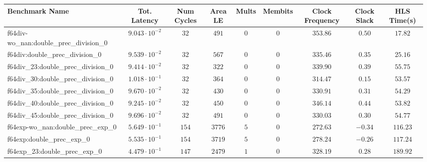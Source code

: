 \begin{tabular}{|l|c|c|c|c|c|c|c|c|}
\hline
Benchmark Name                                 & Tot. Latency            & Num Cycles & Area LE    & Mults   & Membits & Clock Frequency & Clock Slack & HLS Time(s) \\
\hline
f64div-wo\_nan:double\_prec\_division\_0       & $ 9.043 \cdot 10^{-2} $ & $ 32     $ & $ 491    $ & $ 0   $ & $ 0   $ & $ 353.86      $ & $ 0.50    $ & $ 17.82   $ \\
f64div:double\_prec\_division\_0               & $ 9.539 \cdot 10^{-2} $ & $ 32     $ & $ 567    $ & $ 0   $ & $ 0   $ & $ 335.46      $ & $ 0.35    $ & $ 25.16   $ \\
f64div\_23:double\_prec\_division\_0           & $ 9.414 \cdot 10^{-2} $ & $ 32     $ & $ 322    $ & $ 0   $ & $ 0   $ & $ 339.90      $ & $ 0.39    $ & $ 55.75   $ \\
f64div\_30:double\_prec\_division\_0           & $ 1.018 \cdot 10^{-1} $ & $ 32     $ & $ 364    $ & $ 0   $ & $ 0   $ & $ 314.47      $ & $ 0.15    $ & $ 53.57   $ \\
f64div\_35:double\_prec\_division\_0           & $ 9.670 \cdot 10^{-2} $ & $ 32     $ & $ 430    $ & $ 0   $ & $ 0   $ & $ 330.91      $ & $ 0.31    $ & $ 54.29   $ \\
f64div\_40:double\_prec\_division\_0           & $ 9.245 \cdot 10^{-2} $ & $ 32     $ & $ 450    $ & $ 0   $ & $ 0   $ & $ 346.14      $ & $ 0.44    $ & $ 53.82   $ \\
f64div\_45:double\_prec\_division\_0           & $ 9.696 \cdot 10^{-2} $ & $ 32     $ & $ 491    $ & $ 0   $ & $ 0   $ & $ 330.03      $ & $ 0.30    $ & $ 54.77   $ \\
f64exp-wo\_nan:double\_prec\_exp\_0            & $ 5.649 \cdot 10^{-1} $ & $ 154    $ & $ 3776   $ & $ 5   $ & $ 0   $ & $ 272.63      $ & $ -0.34   $ & $ 116.23  $ \\
f64exp:double\_prec\_exp\_0                    & $ 5.535 \cdot 10^{-1} $ & $ 154    $ & $ 3719   $ & $ 5   $ & $ 0   $ & $ 278.24      $ & $ -0.26   $ & $ 117.24  $ \\
f64exp\_23:double\_prec\_exp\_0                & $ 4.479 \cdot 10^{-1} $ & $ 147    $ & $ 2479   $ & $ 1   $ & $ 0   $ & $ 328.19      $ & $ 0.28    $ & $ 189.92  $ \\

\end{tabular}
